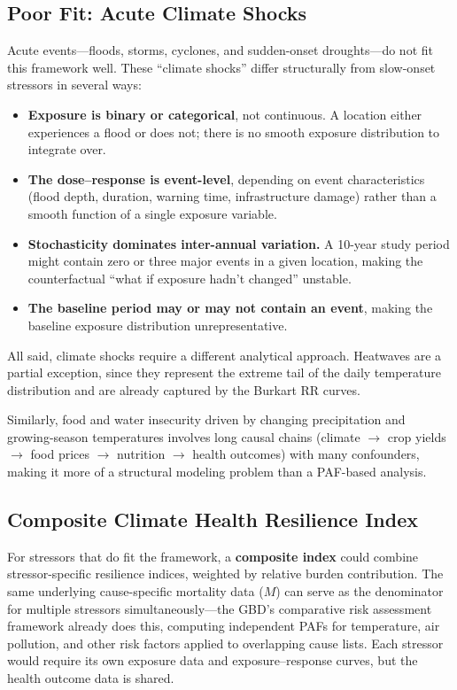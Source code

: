 \documentclass[11pt,a4paper]{article}
\begin{document}
\subsection{Poor Fit: Acute Climate Shocks}

Acute events---floods, storms, cyclones, and sudden-onset droughts---do not fit this framework well. These ``climate shocks'' differ structurally from slow-onset stressors in several ways:
\begin{itemize}[nosep]
  \item \textbf{Exposure is binary or categorical}, not continuous. A location either experiences a flood or does not; there is no smooth exposure distribution to integrate over.
  \item \textbf{The dose--response is event-level}, depending on event characteristics (flood depth, duration, warning time, infrastructure damage) rather than a smooth function of a single exposure variable.
  \item \textbf{Stochasticity dominates inter-annual variation.} A 10-year study period might contain zero or three major events in a given location, making the counterfactual ``what if exposure hadn't changed'' unstable.
  \item \textbf{The baseline period may or may not contain an event}, making the baseline exposure distribution unrepresentative.
\end{itemize}

All said, climate shocks  require a different analytical approach. Heatwaves are a partial exception, since they represent the extreme tail of the daily temperature distribution and are already captured by the Burkart RR curves.

Similarly, food and water insecurity driven by changing precipitation and growing-season temperatures involves long causal chains (climate $\to$ crop yields $\to$ food prices $\to$ nutrition $\to$ health outcomes) with many confounders, making it more of a structural modeling problem than a PAF-based analysis.

\subsection{Composite Climate Health Resilience Index}

For stressors that do fit the framework, a \textbf{composite index} could combine stressor-specific resilience indices, weighted by relative burden contribution. The same underlying cause-specific mortality data ($M$) can serve as the denominator for multiple stressors simultaneously---the GBD's comparative risk assessment framework already does this, computing independent PAFs for temperature, air pollution, and other risk factors applied to overlapping cause lists. Each stressor would require its own exposure data and exposure--response curves, but the health outcome data is shared.
\end{document}
